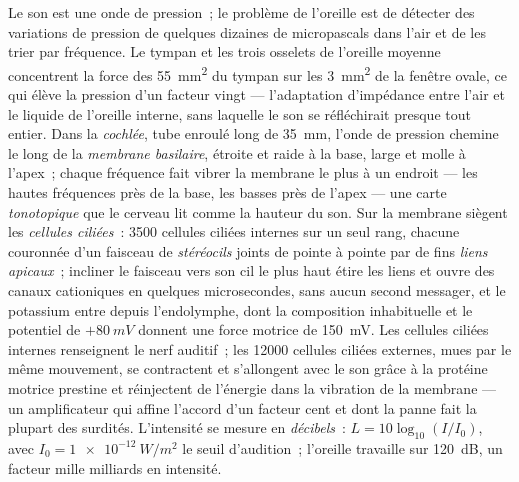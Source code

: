 \begin{definition}[La cochlée]\label{def:b3:sensory-systems:cochlea}
Le son est une onde de pression~; le problème de l'oreille est de
détecter des variations de pression de quelques dizaines de
micropascals dans l'air et de les trier par fréquence. Le tympan et les
trois osselets de l'oreille moyenne concentrent la force des
\qty{55}{mm^2} du tympan sur les \qty{3}{mm^2} de la fenêtre ovale, ce
qui élève la pression d'un facteur vingt --- l'adaptation d'impédance
entre l'air et le liquide de l'oreille interne, sans laquelle le son se
réfléchirait presque tout entier. Dans la \emph{cochlée}, tube enroulé
long de \qty{35}{mm}, l'onde de pression chemine le long de la
\emph{membrane basilaire}, étroite et raide à la base, large et molle à
l'apex~; chaque fréquence fait vibrer la membrane le plus à un endroit
--- les hautes fréquences près de la base, les basses près de l'apex ---
une carte \emph{tonotopique} que le cerveau lit comme la hauteur du son.
Sur la membrane siègent les \emph{cellules ciliées}~: \num{3500}
cellules ciliées internes sur un seul rang, chacune couronnée d'un
faisceau de \emph{stéréocils} joints de pointe à pointe par de fins
\emph{liens apicaux}~; incliner le faisceau vers son cil le plus haut
étire les liens et ouvre des canaux cationiques en quelques
microsecondes, sans aucun second messager, et le potassium entre depuis
l'endolymphe, dont la composition inhabituelle et le potentiel de
$+\qty{80}{mV}$ donnent une force motrice de \qty{150}{mV}. Les cellules
ciliées internes renseignent le nerf auditif~; les \num{12000} cellules
ciliées externes, mues par le même mouvement, se contractent et
s'allongent avec le son grâce à la protéine motrice prestine et
réinjectent de l'énergie dans la vibration de la membrane --- un
amplificateur qui affine l'accord d'un facteur cent et dont la panne
fait la plupart des surdités. L'intensité se mesure en
\emph{décibels}~: $L = 10\log_{10}
(I/I_{0})$, avec $I_{0} = \qty{1e-12}{W/m^2}$ le seuil d'audition~;
l'oreille travaille sur \qty{120}{dB}, un facteur mille milliards en
intensité.
\end{definition}

